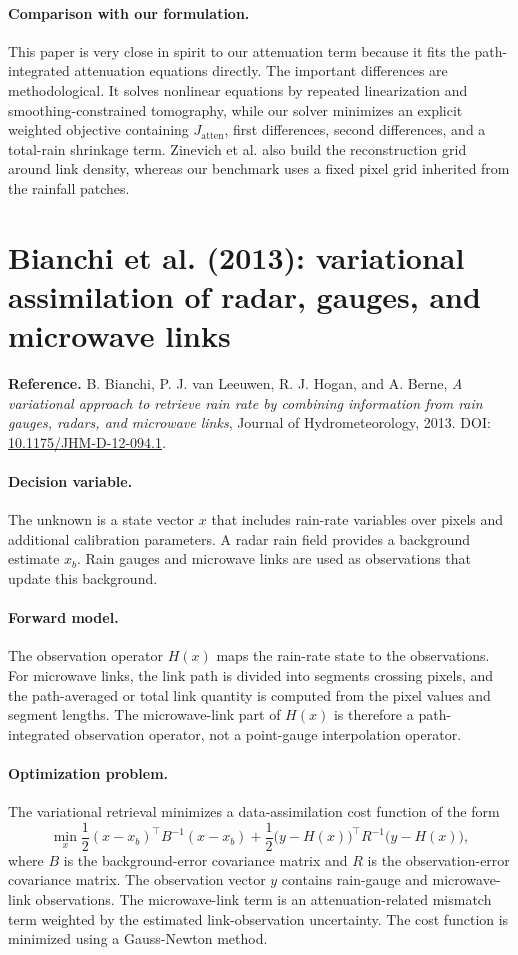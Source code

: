 \documentclass[11pt]{article}
\newcommand{\Jatten}{J_{\mathrm{atten}}}
\begin{document}
\paragraph{Comparison with our formulation.}
This paper is very close in spirit to our attenuation term because it fits the path-integrated attenuation equations directly.
The important differences are methodological.
It solves nonlinear equations by repeated linearization and smoothing-constrained tomography, while our solver minimizes an explicit weighted objective containing $\Jatten$, first differences, second differences, and a total-rain shrinkage term.
Zinevich et al. also build the reconstruction grid around link density, whereas our benchmark uses a fixed pixel grid inherited from the rainfall patches.

\section{Bianchi et al. (2013): variational assimilation of radar, gauges, and microwave links}
\textbf{Reference.}
B. Bianchi, P. J. van Leeuwen, R. J. Hogan, and A. Berne,
\emph{A variational approach to retrieve rain rate by combining information from rain gauges, radars, and microwave links},
Journal of Hydrometeorology, 2013.
DOI: \href{https://doi.org/10.1175/JHM-D-12-094.1}{10.1175/JHM-D-12-094.1}.

\paragraph{Decision variable.}
The unknown is a state vector $x$ that includes rain-rate variables over pixels and additional calibration parameters.
A radar rain field provides a background estimate $x_b$.
Rain gauges and microwave links are used as observations that update this background.

\paragraph{Forward model.}
The observation operator $H(x)$ maps the rain-rate state to the observations.
For microwave links, the link path is divided into segments crossing pixels, and the path-averaged or total link quantity is computed from the pixel values and segment lengths.
The microwave-link part of $H(x)$ is therefore a path-integrated observation operator, not a point-gauge interpolation operator.

\paragraph{Optimization problem.}
The variational retrieval minimizes a data-assimilation cost function of the form
\[
  \min_x
  \frac{1}{2}(x-x_b)^\top B^{-1}(x-x_b)
  +
  \frac{1}{2}\bigl(y-H(x)\bigr)^\top R^{-1}\bigl(y-H(x)\bigr),
\]
where $B$ is the background-error covariance matrix and $R$ is the observation-error covariance matrix.
The observation vector $y$ contains rain-gauge and microwave-link observations.
The microwave-link term is an attenuation-related mismatch term weighted by the estimated link-observation uncertainty.
The cost function is minimized using a Gauss-Newton method.
\end{document}
